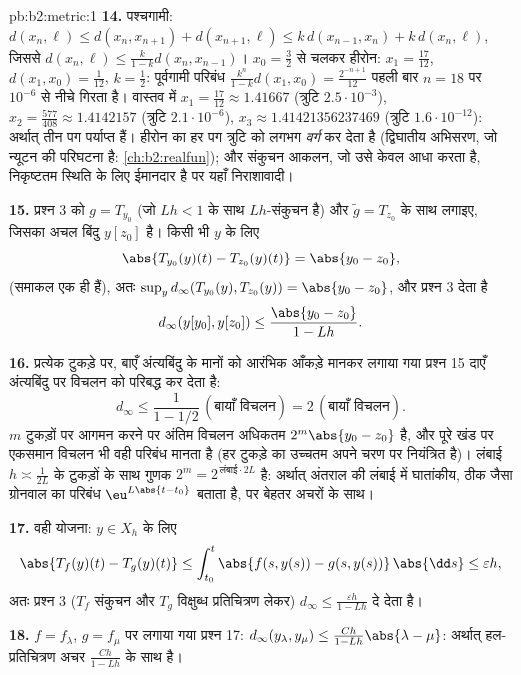 \begin{solution}{pb:b2:metric:1}
\textbf{14.} पश्चगामी: $d(x_n, \ell) \leq d(x_n, x_{n+1}) +
d(x_{n+1}, \ell) \leq k\,d(x_{n-1}, x_n) + k\,d(x_n, \ell)$, जिससे $d(x_n, \ell) \leq \frac{k}{1-k}d(x_n, x_{n-1})$। $x_0 = \frac32$ से चलकर हीरोन: $x_1 = \frac{17}{12}$, $d(x_1, x_0) =
\frac1{12}$,
$k = \frac12$: पूर्वगामी परिबंध $\frac{k^n}{1-k}d(x_1,x_0) = \frac{2^{-n+1}}{12}$ पहली बार $n = 18$ पर $10^{-6}$ से नीचे गिरता है।
वास्तव में $x_1 = \frac{17}{12}
\approx 1.41667$ (त्रुटि $2.5\cdot10^{-3}$), $x_2 =
\frac{577}{408} \approx 1.4142157$ (त्रुटि $2.1\cdot10^{-6}$), $x_3 \approx 1.41421356237469$ (त्रुटि $1.6\cdot10^{-12}$):
अर्थात् तीन पग पर्याप्त हैं। हीरोन का हर पग त्रुटि को लगभग \emph{वर्ग}
कर देता है (द्विघातीय अभिसरण, जो न्यूटन की परिघटना है: \cref{ch:b2:realfun}); और संकुचन
आकलन, जो उसे केवल आधा करता है, निकृष्टतम स्थिति के लिए ईमानदार है पर
यहाँ निराशावादी।

\textbf{15.} प्रश्न 3 को $g = T_{y_0}$ (जो $Lh < 1$ के साथ $Lh$-संकुचन है) और $\widetilde g = T_{z_0}$ के
साथ लगाइए, जिसका अचल बिंदु $y[z_0]$ है। किसी भी $y$ के लिए
\[
\abs{T_{y_0}(y)(t) - T_{z_0}(y)(t)} = \abs{y_0 - z_0},
\]
(समाकल एक ही हैं), अतः $\sup_y
d_\infty(T_{y_0}(y), T_{z_0}(y)) = \abs{y_0 - z_0}$, और प्रश्न 3 देता है
\[
d_\infty(y[y_0], y[z_0]) \leq \frac{\abs{y_0 - z_0}}{1 - Lh} .
\]

\textbf{16.} प्रत्येक टुकड़े पर, बाएँ अंत्यबिंदु के मानों को आरंभिक
आँकड़े मानकर लगाया गया प्रश्न 15 दाएँ अंत्यबिंदु पर विचलन को परिबद्ध कर
देता है:
\[
d_\infty \leq \frac{1}{1 - 1/2}\,(\text{बायाँ विचलन})
= 2\,(\text{बायाँ विचलन}) .
\] $m$ टुकड़ों पर आगमन
करने पर अंतिम विचलन अधिकतम $2^m\abs{y_0 - z_0}$ है, और पूरे खंड पर एकसमान विचलन भी वही
परिबंध मानता है (हर टुकड़े का उच्चतम अपने चरण पर नियंत्रित है)। लंबाई
$h \asymp \frac1{2L}$ के टुकड़ों के साथ गुणक $2^m = 2^{\,\text{लंबाई}\cdot 2L}$ है: अर्थात् अंतराल की
लंबाई में घातांकीय, ठीक जैसा ग्रोनवाल का परिबंध $\eu^{L\abs{t-t_0}}$ बताता है, पर बेहतर
अचरों के साथ।

\textbf{17.} वही योजना: $y \in X_h$ के लिए
\[
\abs{T_f(y)(t) - T_g(y)(t)} \leq \int_{t_0}^t \abs{f(s,y(s)) -
g(s,y(s))}\,\abs{\dd s} \leq \varepsilon h ,
\]
अतः प्रश्न 3 ($T_f$ संकुचन और $T_g$ विक्षुब्ध प्रतिचित्रण लेकर) $d_\infty \leq \frac{\varepsilon h}{1 - Lh}$ दे
देता है।

\textbf{18.} $f = f_\lambda$, $g =
f_\mu$ पर लगाया गया प्रश्न 17: $d_\infty(y_\lambda, y_\mu) \leq \frac{Ch}{1 -
Lh}\abs{\lambda - \mu}$: अर्थात् हल-प्रतिचित्रण
अचर $\frac{Ch}{1-Lh}$ के साथ  है।


\end{solution}
